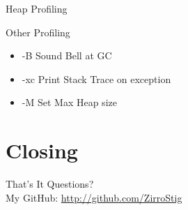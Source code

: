 \begin{frame}[t]{Heap Profiling}
\end{frame}

\begin{frame}[t]{Other Profiling}
    \begin{itemize}[<+->]
        \item \alert{-B} Sound Bell at GC
        \item \alert{-xc} Print Stack Trace on exception
        \item \alert{-M} Set Max Heap size
    \end{itemize}
\end{frame}

\section{Closing}
\begin{frame}[t]{That's It}
    Questions? \\
    My GitHub: \url{http://github.com/ZirroStig}
\end{frame}


